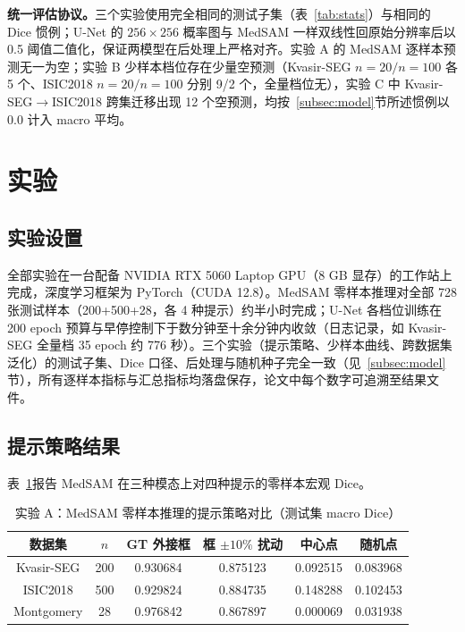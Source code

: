 \documentclass[zihao=-4,a4paper]{ctexart}
\begin{document}
\textbf{统一评估协议。}三个实验使用完全相同的测试子集（表~\ref{tab:stats}）与相同的 Dice 惯例；U-Net 的 $256\times256$ 概率图与 MedSAM 一样双线性回原始分辨率后以 0.5 阈值二值化，保证两模型在后处理上严格对齐。实验 A 的 MedSAM 逐样本预测无一为空；实验 B 少样本档位存在少量空预测（Kvasir-SEG $n=20/n=100$ 各 5 个、ISIC2018 $n=20/n=100$ 分别 9/2 个，全量档位无），实验 C 中 Kvasir-SEG$\rightarrow$ISIC2018 跨集迁移出现 12 个空预测，均按~\ref{subsec:model}节所述惯例以 0.0 计入 macro 平均。

\section{实验}

\subsection{实验设置}

全部实验在一台配备 NVIDIA RTX 5060 Laptop GPU（8 GB 显存）的工作站上完成，深度学习框架为 PyTorch（CUDA 12.8）。MedSAM 零样本推理对全部 728 张测试样本（200+500+28，各 4 种提示）约半小时完成；U-Net 各档位训练在 200 epoch 预算与早停控制下于数分钟至十余分钟内收敛（日志记录，如 Kvasir-SEG 全量档 35 epoch 约 776 秒）。三个实验（提示策略、少样本曲线、跨数据集泛化）的测试子集、Dice 口径、后处理与随机种子完全一致（见~\ref{subsec:model}节），所有逐样本指标与汇总指标均落盘保存，论文中每个数字可追溯至结果文件。

\subsection{提示策略结果}

表~\ref{tab:prompt}报告 MedSAM 在三种模态上对四种提示的零样本宏观 Dice。

\begin{table}[htbp]
\centering
\caption{实验 A：MedSAM 零样本推理的提示策略对比（测试集 macro Dice）}
\label{tab:prompt}
\begin{tabular}{cccccc}
\toprule
数据集 & $n$ & GT 外接框 & \makecell{框 $\pm10\%$\\扰动} & 中心点 & 随机点 \\
\midrule
Kvasir-SEG & 200 & 0.930684 & 0.875123 & 0.092515 & 0.083968 \\
ISIC2018   & 500 & 0.929824 & 0.884735 & 0.148288 & 0.102453 \\
Montgomery & 28  & 0.976842 & 0.867897 & 0.000069 & 0.031938 \\
\bottomrule
\end{tabular}
\end{table}
\end{document}
